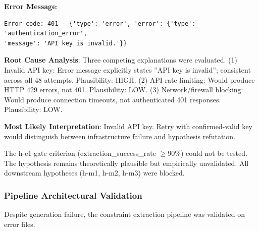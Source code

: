\textbf{Error Message}:
\begin{verbatim}
Error code: 401 - {'type': 'error', 'error': {'type': 'authentication_error', 
'message': 'API key is invalid.'}}
\end{verbatim}

\textbf{Root Cause Analysis}: Three competing explanations were evaluated. (1) Invalid API key: Error message explicitly states ''API key is invalid''; consistent across all 48 attempts. Plausibility: HIGH. (2) API rate limiting: Would produce HTTP 429 errors, not 401. Plausibility: LOW. (3) Network/firewall blocking: Would produce connection timeouts, not authenticated 401 responses. Plausibility: LOW.

\textbf{Most Likely Interpretation}: Invalid API key. Retry with confirmed-valid key would distinguish between infrastructure failure and hypothesis refutation.

The h-e1 gate criterion (extraction\_success\_rate $\geq 90$\%) could not be tested. The hypothesis remains theoretically plausible but empirically unvalidated. All downstream hypotheses (h-m1, h-m2, h-m3) were blocked.

\subsubsection{Pipeline Architectural Validation}

Despite generation failure, the constraint extraction pipeline was validated on error files.

\begin{table}[htbp]
\centering
{}
\end{table}

